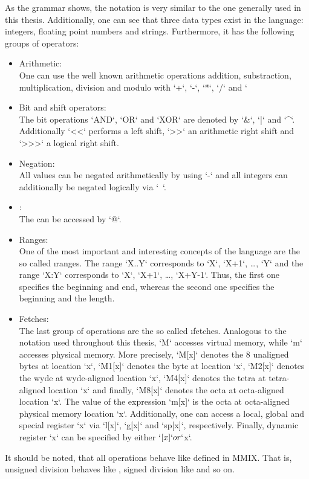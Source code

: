 As the grammar shows, the notation is very similar to the one generally used in this thesis. Additionally, one can see that three data types exist in the language: integers, floating point numbers and strings. Furthermore, it has the following groups of operators:
\begin{itemize}
	\item Arithmetic:\\
	One can use the well known arithmetic operations addition, substraction, multiplication, division and modulo with `+`, `-`, `*`, `/` and `%
	\item Bit and shift operators:\\
	The bit operations `AND`, `OR` and `XOR` are denoted by `&`, `|` and `^`. Additionally `<<` performs a left shift, `>>` an arithmetic right shift and `>>>` a logical right shift.
	\item Negation:\\
	All values can be negated arithmetically by using `-` and all integers can additionally be negated logically via `~`.
	\item {}:\\
	The  can be accessed by `@`.
	\item Ranges:\\
	One of the most important and interesting concepts of the language are the so called \i{ranges}. The range `X..Y` corresponds to `X`, `X+1`, \dots, `Y` and the range `X:Y` corresponds to `X`, `X+1`, \dots, `X+Y-1`. Thus, the first one specifies the beginning and end, whereas the second one specifies the beginning and the length.
	\item Fetches:\\
	The last group of operations are the so called \i{fetches}. Analogous to the notation used throughout this thesis, `M` accesses virtual memory, while `m` accesses physical memory. More precisely, `M[x]` denotes the 8 unaligned bytes at location `x`, `M1[x]` denotes the byte at location `x`, `M2[x]` denotes the wyde at wyde-aligned location `x`, `M4[x]` denotes the tetra at tetra-aligned location `x` and finally, `M8[x]` denotes the octa at octa-aligned location `x`. The value of the expression `m[x]` is the octa at octa-aligned physical memory location `x`. Additionally, one can access a local, global and special register `x` via `l[x]`, `g[x]` and `sp[x]`, respectively. Finally, dynamic register `x` can be specified by either `$[x]` or `$x`.
\end{itemize}
It should be noted, that all operations behave like defined in MMIX. That is, unsigned division behaves like , signed division like  and so on.

